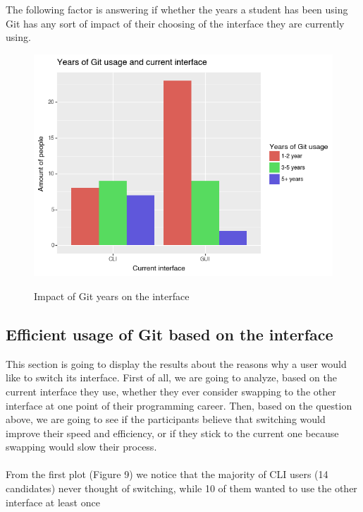 \documentclass[]{report}
\begin{document}
		The following factor is answering if whether the years a student has been using Git has any sort of impact of their choosing of the interface they are currently using.
		\begin{figure}[H]
			\centering
			\includegraphics[width=0.75\linewidth]{YearsGitImpact}\\
			\caption{Impact of Git years on the interface}
			\label{fig: 8}
		\end{figure}
		
		\subsection{Efficient usage of Git based on the interface}
		
		This section is going to display the  results about the reasons why a user would like to switch its interface. First of all, we are going to analyze, based on the current interface they use, whether they ever consider swapping to the other interface at one point of their programming career.
		Then, based on the question above, we are going to see if the participants believe that switching would improve their speed and efficiency, or if they stick to the current one because swapping would slow their process.\\\\
		
		From the first plot (Figure 9) we notice that the majority of CLI users (14 candidates) never thought of switching, while 10 of them wanted to use the other interface at least once
		
\end{document}
